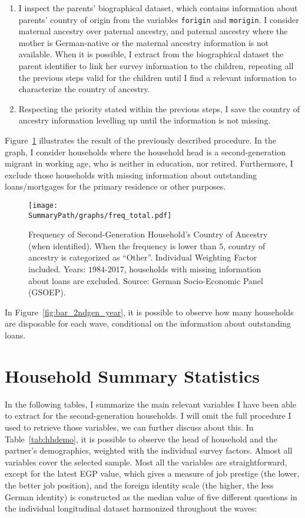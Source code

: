 \documentclass[12pt,a4paper]{article}
\newcommand*{\SummaryPath}{../../../res/summary}%
\begin{document}
\begin{enumerate}
     \item I inspect the parents' biographical dataset, which contains information about parents' country of origin from the variables \texttt{forigin} and \texttt{morigin}. I consider maternal ancestry over paternal ancestry, and paternal ancestry where the mother is German-native or the maternal ancestry information is not available. When it is possible, I extract from the biographical dataset the parent identifier to link her survey information to the children, repeating all the previous steps valid for the children until I find a relevant information to characterize the country of ancestry.
     \item Respecting the priority stated within the previous steps, I save the country of ancestry information levelling up until the information is not missing. 
 \end{enumerate}

Figure~\ref{fig:bar_2ndgen_ancestry} illustrates the result of the previously described procedure. In the graph, I consider households where the household head is a second-generation migrant in working age, who is neither in education, nor retired. Furthermore, I exclude those households with missing information about outstanding loans/mortgages for the primary residence or other purposes.

\begin{figure}[htbp!]
    \centering
    \texttt{[image: \\SummaryPath/graphs/freq\_total.pdf]}
    \caption{Frequency of Second-Generation Household's Country of Ancestry (when identified). When the frequency is lower than $5$, country of ancestry is categorized as ``Other''. Individual Weighting Factor included. Years: $1984$-$2017$, households with missing information about loans are excluded. Source: German Socio-Economic Panel (GSOEP).}\label{fig:bar_2ndgen_ancestry}
\end{figure}

In Figure~\ref{fig:bar_2ndgen_year}, it is possible to observe how many households are disposable for each wave, conditional on the information about outstanding loans.

\section{Household Summary Statistics}

In the following tables, I summarize the main relevant variables I have been able to extract for the second-generation households. I will omit the full procedure I used to retrieve those variables, we can further discuss about this. In Table~\ref{tab:hhdemo}, it is possible to observe the head of household and the partner's demographics, weighted with the individual survey factors. Almost all variables cover the selected sample. Most all the variables are straightforward, except for the latest EGP value, which gives a measure of job prestige (the lower, the better job position), and the foreign identity scale (the higher, the less German identity) is constructed as the median value of five different questions in the individual longitudinal dataset harmonized throughout the waves: 
\end{document}
